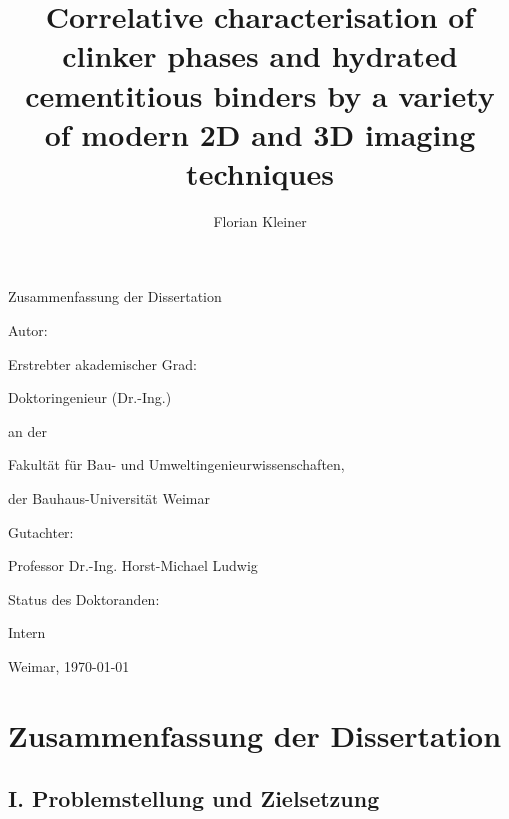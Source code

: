 \documentclass[11pt, a4paper]{article}
\title{Correlative characterisation of clinker phases and hydrated cementitious binders by a variety of modern 2D and 3D imaging techniques}
\author{Florian Kleiner}
\begin{document}
\begin{titlepage}
    \centering
    \vspace*{1cm}
    
    {\Large Zusammenfassung der Dissertation\par}
    \vspace{1.5cm}
    
    {\LARGE \textbf{\thetitle}\par}
    \vspace{2cm}
    
    {\large Autor:\par}
    {\Large \theauthor\par}
    \vspace{1cm}
    
    {\large Erstrebter akademischer Grad:\par}
    {\Large Doktoringenieur (Dr.-Ing.)\par}
    \vspace{1cm}
    
    { an der\par}
    {\large Fakultät für Bau- und Umweltingenieurwissenschaften,\par}
    {\large der Bauhaus-Universität Weimar\par}
    \vspace{1cm}

    {\large Gutachter:\par}
    {\Large Professor Dr.-Ing. Horst-Michael Ludwig\par}
    \vspace{1cm}
    
    {\large Status des Doktoranden:\par}
    {\Large Intern\par}
    \vspace{3cm}
    
    \vfill
    
    {\large Weimar, \today\par}
\end{titlepage}

\newpage

\section*{Zusammenfassung der Dissertation}

\subsection*{I. Problemstellung und Zielsetzung}
\end{document}
